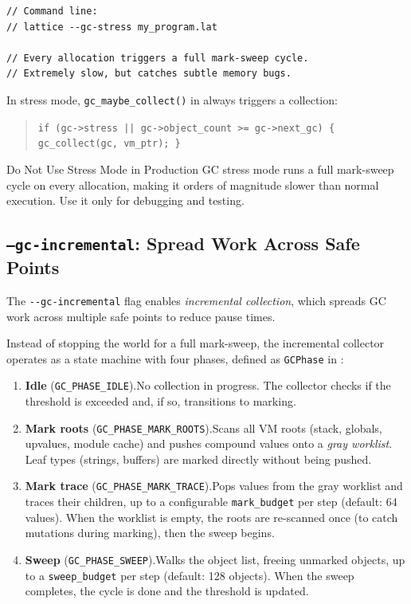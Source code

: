 \begin{lstlisting}[language=Lattice, caption={Stress testing the GC}]
// Command line:
// lattice --gc-stress my_program.lat

// Every allocation triggers a full mark-sweep cycle.
// Extremely slow, but catches subtle memory bugs.
\end{lstlisting}

In stress mode, \lstinline|gc_maybe_collect()| in  always triggers a collection:

\begin{quote}
\texttt{if (gc->stress || gc->object\_count >= gc->next\_gc) \{ gc\_collect(gc, vm\_ptr); \}}
\end{quote}

\begin{warnbox}{Do Not Use Stress Mode in Production}
GC stress mode runs a full mark-sweep cycle on every allocation, making it orders of magnitude slower than normal execution.
Use it only for debugging and testing.
\end{warnbox}

\subsection{\texttt{--gc-incremental}: Spread Work Across Safe Points}\label{subsec:gc-incremental}


The \lstinline|--gc-incremental| flag enables \emph{incremental collection}, which spreads GC work across multiple safe points to reduce pause times.

Instead of stopping the world for a full mark-sweep, the incremental collector operates as a state machine with four phases, defined as \lstinline|GCPhase| in :

\begin{enumerate}
  \item \textbf{Idle} (\lstinline|GC_PHASE_IDLE|).\quad No collection in progress. The collector checks if the threshold is exceeded and, if so, transitions to marking.

  \item \textbf{Mark roots} (\lstinline|GC_PHASE_MARK_ROOTS|).\quad Scans all VM roots (stack, globals, upvalues, module cache) and pushes compound values onto a \emph{gray worklist}. Leaf types (strings, buffers) are marked directly without being pushed.

  \item \textbf{Mark trace} (\lstinline|GC_PHASE_MARK_TRACE|).\quad Pops values from the gray worklist and traces their children, up to a configurable \lstinline|mark_budget| per step (default: 64 values). When the worklist is empty, the roots are re-scanned once (to catch mutations during marking), then the sweep begins.

  \item \textbf{Sweep} (\lstinline|GC_PHASE_SWEEP|).\quad Walks the object list, freeing unmarked objects, up to a \lstinline|sweep_budget| per step (default: 128 objects). When the sweep completes, the cycle is done and the threshold is updated.
\end{enumerate}

